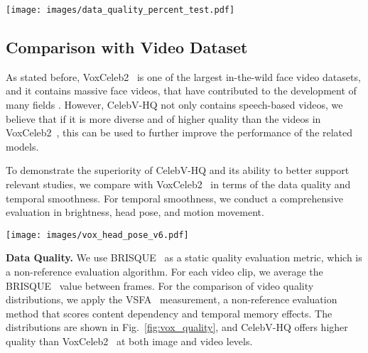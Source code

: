 \documentclass[runningheads]{llncs}
\begin{document}
\begin{figure*}[t]
\centering
\texttt{[image: images/data\_quality\_percent\_test.pdf]}
\caption{\textbf{Distributions of image and video quality, and brightness variance.} (a) Image quality and (b) video quality are measured by BRISQUE~\cite{brisque} and VSFA~\cite{videoquality}, the higher score, the better quality. 
(c) The video brightness is measured by \cite{bezryadin2007brightness}, the low variance reflects the more stable in brightness aspect. 
(d) Samples at different brightness, with brightness values in the upper right corner.}
\label{fig:vox_quality}
\end{figure*}


\subsection{Comparison with Video Dataset}

As stated before, VoxCeleb2~\cite{vox2} is one of the largest in-the-wild face video datasets, and it contains massive face videos, that have contributed to the development of many fields \cite{ephrat2018looking,zhu2021deep,gao2021visualvoice,zhou2019talking,chen2019hierarchical,zhu2021arbitrary,zhou2021pose,ji2021audio}. 
However, CelebV-HQ not only contains speech-based videos, we believe that if it is more diverse and of higher quality than the videos in VoxCeleb2~\cite{vox2}, this can be used to further improve the performance of the related models.

To demonstrate the superiority of CelebV-HQ and its ability to better support relevant studies, we compare with VoxCeleb2~\cite{vox2} in terms of the data quality and temporal smoothness. 
For temporal smoothness, we conduct a comprehensive evaluation in brightness, head pose, and motion movement. 


\begin{figure*}[t]
\centering
\texttt{[image: images/vox\_head\_pose\_v6.pdf]}
\caption{\textbf{Distributions of average head pose and movement range.} There is a wide range of head movement in CelebV-HQ, including both stable videos (less than 20 of movement) and videos with significant movement (from 75 to 100).}
\label{fig:vox_pose}
\end{figure*}



\noindent \textbf{Data Quality. } We use BRISQUE~\cite{brisque} as a static quality evaluation metric, which is a non-reference evaluation algorithm. For each video clip, we average the BRISQUE~\cite{brisque} value between frames. 
For the comparison of video quality distributions, we apply the VSFA~\cite{videoquality} measurement, a non-reference evaluation method that scores content dependency and temporal memory effects. 
The distributions are shown in Fig.~\ref{fig:vox_quality}, and CelebV-HQ offers higher quality than VoxCeleb2~\cite{vox2} at both image and video levels. 
\end{document}
